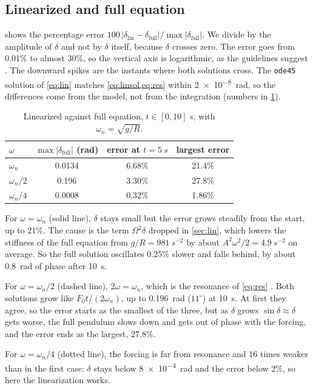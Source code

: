 \documentclass[11pt,a4paper]{article}
\begin{document}
\subsection{Linearized and full equation}
 shows the percentage error $100\,|\delta_{\text{lin}}-\delta_{\text{full}}|/\max|\delta_{\text{full}}|$. We divide by the amplitude of $\delta$ and not by $\delta$ itself, because $\delta$ crosses zero. The error goes from 0.01\% to almost 30\%, so the vertical axis is logarithmic, as the guidelines suggest \cite{guidelines}. The downward spikes are the instants where both solutions cross. The \texttt{ode45} solution of \cref{eq:lin} matches \cref{eq:linsol,eq:res} within \SI{2e-8}{rad}, so the differences come from the model, not from the integration (numbers in \cref{tab:lin}).
\begin{table}[htbp]
\centering
\caption{Linearized against full equation, $t\in[0,10]$ s, with $\omega_n=\sqrt{g/R}$.}\label{tab:lin}
\begin{tabular}{lccc}
\toprule
$\omega$ & $\max|\delta_{\text{full}}|$ (rad) & error at $t=\SI{5}{s}$ & largest error\\
\midrule
$\omega_n$ & 0.0134 & 6.68\% & 21.4\%\\
$\omega_n/2$ & 0.196 & 3.30\% & 27.8\%\\
$\omega_n/4$ & 0.0008 & 0.32\% & 1.86\%\\
\bottomrule
\end{tabular}
\end{table}

For $\omega=\omega_n$ (solid line), $\delta$ stays small but the error grows steadily from the start, up to 21\%. The cause is the term $\Omega^2\delta$ dropped in \cref{sec:lin}, which lowers the stiffness of the full equation from $g/R=\SI{981}{s^{-2}}$ by about $A^2\omega^2/2=\SI{4.9}{s^{-2}}$ on average. So the full solution oscillates 0.25\% slower and falls behind, by about \SI{0.8}{rad} of phase after \SI{10}{s}.

For $\omega=\omega_n/2$ (dashed line), $2\omega=\omega_n$, which is the resonance of \cref{eq:res} \cite{notes}. Both solutions grow like $F_0t/(2\omega_n)$, up to \SI{0.196}{rad} ($11^\circ$) at \SI{10}{s}. At first they agree, so the error starts as the smallest of the three, but as $\delta$ grows $\sin\delta\approx\delta$ gets worse, the full pendulum slows down and gets out of phase with the forcing, and the error ends as the largest, 27.8\%.

For $\omega=\omega_n/4$ (dotted line), the forcing is far from resonance and 16 times weaker than in the first case: $\delta$ stays below \SI{8e-4}{rad} and the error below 2\%, so here the linearization works.
\end{document}

